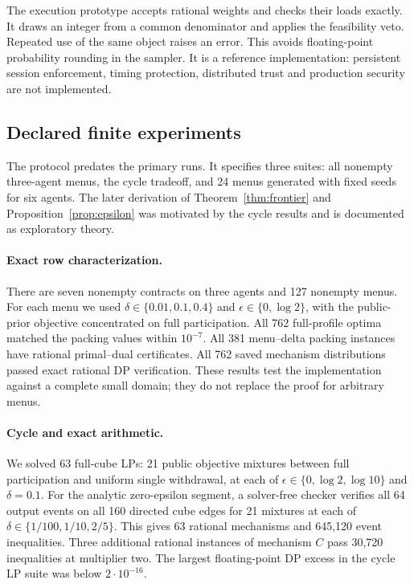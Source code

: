 \documentclass[sigconf,nonacm]{aamas}
\begin{document}
The execution prototype accepts rational weights and checks their loads exactly. It draws an integer from a common denominator and applies the feasibility veto. Repeated use of the same object raises an error. This avoids floating-point probability rounding in the sampler. It is a reference implementation: persistent session enforcement, timing protection, distributed trust and production security are not implemented.

\subsection{Declared finite experiments}
The protocol predates the primary runs. It specifies three suites: all nonempty three-agent menus, the cycle tradeoff, and 24 menus generated with fixed seeds for six agents. The later derivation of Theorem~\ref{thm:frontier} and Proposition~\ref{prop:epsilon} was motivated by the cycle results and is documented as exploratory theory.

\paragraph{Exact row characterization.}
There are seven nonempty contracts on three agents and 127 nonempty menus. For each menu we used $\delta\in\{0.01,0.1,0.4\}$ and $\epsilon\in\{0,\log2\}$, with the public-prior objective concentrated on full participation. All 762 full-profile optima matched the packing values within $10^{-7}$. All 381 menu--delta packing instances have rational primal--dual certificates. All 762 saved mechanism distributions passed exact rational DP verification. These results test the implementation against a complete small domain; they do not replace the proof for arbitrary menus.

\paragraph{Cycle and exact arithmetic.}
We solved 63 full-cube LPs: 21 public objective mixtures between full participation and uniform single withdrawal, at each of $\epsilon\in\{0,\log2,\log10\}$ and $\delta=0.1$. For the analytic zero-epsilon segment, a solver-free checker verifies all 64 output events on all 160 directed cube edges for 21 mixtures at each of $\delta\in\{1/100,1/10,2/5\}$. This gives 63 rational mechanisms and 645,120 event inequalities. Three additional rational instances of mechanism $C$ pass 30,720 inequalities at multiplier two. The largest floating-point DP excess in the cycle LP suite was below $2\cdot10^{-16}$.
\end{document}
